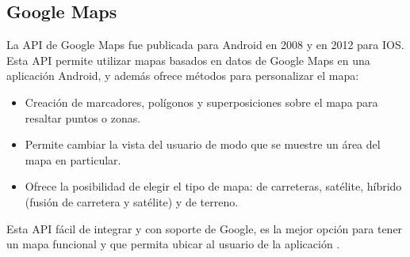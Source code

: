 \subsection{ Google Maps }

La API de Google Maps \cite{URL::GoogleMapsApi} fue publicada para Android en 2008 y en 2012 para IOS. Esta API permite utilizar mapas basados en datos de Google Maps en una aplicación Android, y además ofrece métodos para personalizar el mapa:
\begin{itemize}
    \item Creación de marcadores, polígonos y superposiciones sobre el mapa para resaltar puntos o zonas. 
    \item Permite cambiar la vista del usuario de modo que se muestre un área del mapa en particular. 
    \item Ofrece la posibilidad de elegir el tipo de mapa: de carreteras, satélite, híbrido (fusión de carretera y satélite) y de terreno.
\end{itemize}

Esta API fácil de integrar y con soporte de Google, es la mejor opción para tener un mapa funcional y que permita ubicar al usuario de la aplicación \ULLAR{}.
